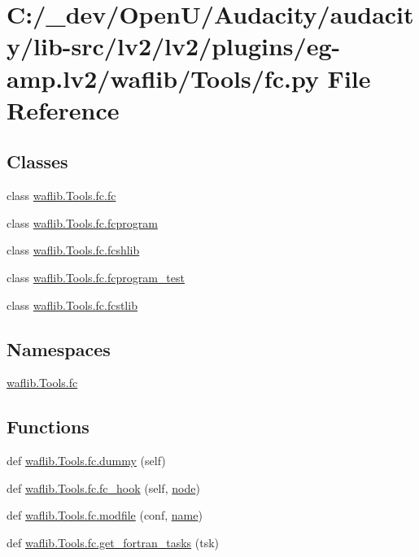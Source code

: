 \hypertarget{lv2_2plugins_2eg-amp_8lv2_2waflib_2_tools_2fc_8py}{}\section{C\+:/\+\_\+dev/\+Open\+U/\+Audacity/audacity/lib-\/src/lv2/lv2/plugins/eg-\/amp.lv2/waflib/\+Tools/fc.py File Reference}
\label{lv2_2plugins_2eg-amp_8lv2_2waflib_2_tools_2fc_8py}
\subsection*{Classes}
\begin{DoxyCompactItemize}
\item 
class \hyperlink{classwaflib_1_1_tools_1_1fc_1_1fc}{waflib.\+Tools.\+fc.\+fc}
\item 
class \hyperlink{classwaflib_1_1_tools_1_1fc_1_1fcprogram}{waflib.\+Tools.\+fc.\+fcprogram}
\item 
class \hyperlink{classwaflib_1_1_tools_1_1fc_1_1fcshlib}{waflib.\+Tools.\+fc.\+fcshlib}
\item 
class \hyperlink{classwaflib_1_1_tools_1_1fc_1_1fcprogram__test}{waflib.\+Tools.\+fc.\+fcprogram\+\_\+test}
\item 
class \hyperlink{classwaflib_1_1_tools_1_1fc_1_1fcstlib}{waflib.\+Tools.\+fc.\+fcstlib}
\end{DoxyCompactItemize}
\subsection*{Namespaces}
\begin{DoxyCompactItemize}
\item 
 \hyperlink{namespacewaflib_1_1_tools_1_1fc}{waflib.\+Tools.\+fc}
\end{DoxyCompactItemize}
\subsection*{Functions}
\begin{DoxyCompactItemize}
\item 
def \hyperlink{namespacewaflib_1_1_tools_1_1fc_a27d355b521fb9e2bf9fa51b4c5b86a75}{waflib.\+Tools.\+fc.\+dummy} (self)
\item 
def \hyperlink{namespacewaflib_1_1_tools_1_1fc_a32c4c535596617f7d93fadd0607f18eb}{waflib.\+Tools.\+fc.\+fc\+\_\+hook} (self, \hyperlink{structnode}{node})
\item 
def \hyperlink{namespacewaflib_1_1_tools_1_1fc_ae8fd3a39f47bdf4cb2e5d16cbdacd4e0}{waflib.\+Tools.\+fc.\+modfile} (conf, \hyperlink{lib_2expat_8h_a1b49b495b59f9e73205b69ad1a2965b0}{name})
\item 
def \hyperlink{namespacewaflib_1_1_tools_1_1fc_a042f42940a7e5040b3d6e9c3dd3df7f4}{waflib.\+Tools.\+fc.\+get\+\_\+fortran\+\_\+tasks} (tsk)
\end{DoxyCompactItemize}
